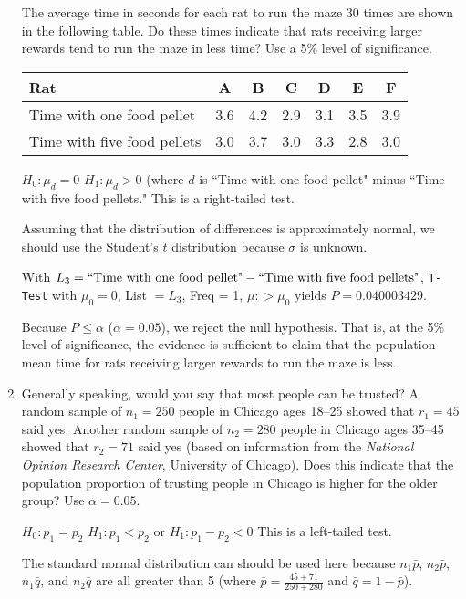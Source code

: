 \documentclass{article}
\newcommand{\answer}[1]{\color{red}#1}
\begin{document}
\begin{enumerate}
The average time in seconds for each rat to run the maze 30 times are shown in the following table.  Do these times indicate that rats receiving larger rewards tend to run the maze in less time?  Use a 5\% level of significance.  

\begin{center}
\begin{tabular}{l|cccccc}
Rat & A & B & C & D & E & F  \\
\hline
Time with one food pellet & 3.6 & 4.2 & 2.9 & 3.1 & 3.5 & 3.9  \\
\hline
Time with five food pellets & 3.0 & 3.7 & 3.0 & 3.3 & 2.8 & 3.0  \\
\end{tabular}
\end{center}

{\answer 
$H_0: \mu_d = 0$  
$H_1: \mu_d > 0$ (where $d$ is ``Time with one food pellet" minus ``Time with five food pellets."  
This is a right-tailed test.
	
Assuming that the distribution of differences is approximately normal, we should use the Student's $t$ distribution because $\sigma$ is unknown.   	
	
With $L_3 = \textnormal{``Time with one food pellet"} - \textnormal{``Time with five food pellets"}$, \texttt{T-Test} with $\mu_0 = 0$, List $=L_3$, Freq = 1, $\mu: > \mu_0$ yields $P = 0.040003429$.   
	
Because $P \leq \alpha$ ($\alpha= 0.05$), we reject the null hypothesis. That is, at the 5\% level of significance, the evidence is sufficient to claim that the population mean time for rats receiving larger rewards to run the maze is less. 
}
 
\vfill

\item Generally speaking, would you say that most people can be trusted? A random sample of $n_1=250$ people in Chicago ages 18--25 showed that $r_1=45$ said yes. Another random sample of $n_2=280$ people in Chicago ages 35--45 showed that $r_2=71$ said yes (based on information from the {\it National Opinion Research Center}, University of Chicago). Does this indicate that the population proportion of trusting people in Chicago is higher for the older group? Use $\alpha = 0.05$.  

{\answer 
$H_0: p_1=p_2$  
$H_1: p_1 < p_2$  or $H_1: p_1 - p_2 < 0$ 
This is a left-tailed test.  
	
The standard normal distribution can should be used here because $n_1\bar{p}$, $n_2\bar{p}$, $n_1\bar{q}$, and $n_2\bar{q}$ are all greater than 5 (where $\bar{p} = \frac{45+71}{250+280}$ and $\bar{q} = 1-\bar{p}$).  

}
\end{enumerate}
\end{document}
